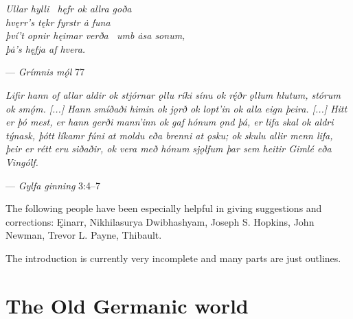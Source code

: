 \vspace{5mm}

\begin{center}{\Large \emph{Ullar hylli \hld\ hęfr ok allra goða \\
hvęrr’s tękr fyrstr ȧ funa \\
því’t opnir hęimar verða \hld\ umb ȧsa sonum, \\
þȧ’s hęfja af hvera.}}\end{center}

\begin{flushright}%
— \emph{Grímnis mǫ́l} 77%
\end{flushright}

\vspace{5mm}

\begin{center}{\Large \emph{Lifir hann of allar aldir ok stjórnar ǫllu ríki sínu ok rę́ðr ǫllum hlutum, stórum ok smǫ́m. [...] Hann smíðaði himin ok jǫrð ok lopt’in ok alla eign þeira. [...] Hitt er þó mest, er hann gerði mann’inn ok gaf hónum ǫnd þá, er lifa skal ok aldri týnask, þótt líkamr fúni at moldu eða brenni at ǫsku; ok skulu allir menn lifa, þeir er rétt eru siðaðir, ok vera með hónum sjǫlfum þar sem heitir Gimlé eða Vingólf.}}\end{center}
\begin{flushright}%
— \emph{Gylfa ginning} 3:4–7%
\end{flushright}

\vfill

\newpage\thispagestyle{empty}

The following people have been especially helpful in giving suggestions and corrections: Ęinarr, Nikhilasurya Dwibhashyam, Joseph S. Hopkins, John Newman, Trevor L. Payne, Thibault.

\newpage\thispagestyle{empty}

\tableofcontents

\newpage\thispagestyle{empty}

\newpage


\printbibliography%


The introduction is currently very incomplete and many parts are just outlines.

\section{The Old Germanic world}

